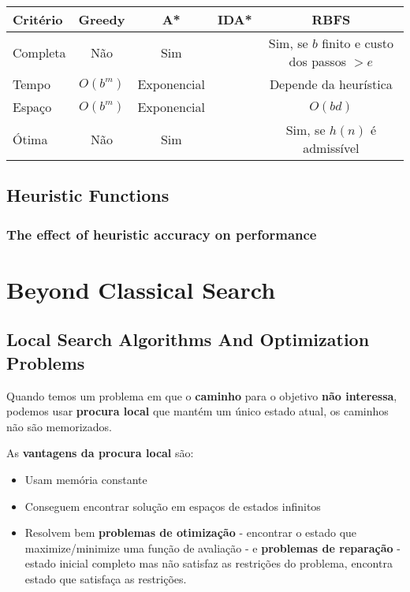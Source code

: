 \documentclass[11pt]{article}
\begin{document}
\begin{tabular}[t]{ | l | c | c | c | c | }\hline
    Critério & Greedy   & A*          & IDA* & RBFS \\\hline
    Completa & Não      & Sim         &      & Sim, se $b$ finito e custo dos passos $>e$ \\\hline
    Tempo    & $O(b^m)$ & Exponencial &      & Depende da heurística \\\hline
    Espaço   & $O(b^m)$ & Exponencial &      & $O(bd)$ \\\hline
    Ótima    & Não      & Sim         &      & Sim, se $h(n)$ é admissível     \\\hline
\end{tabular}

\subsection{Heuristic Functions}


\subsubsection{The effect of heuristic accuracy on performance}


\newpage
\section{Beyond Classical Search}

\subsection{Local Search Algorithms And Optimization Problems}

Quando temos um problema em que o \textbf{caminho} para o objetivo \textbf{não interessa}, podemos usar \textbf{procura local} que mantém um único estado atual, os caminhos não são memorizados.\vspace{4pt}

As \textbf{vantagens da procura local} são:
\begin{itemize}[topsep=2pt,itemsep=0pt]
    \item Usam memória constante
    \item Conseguem encontrar solução em espaços de estados infinitos
    \item Resolvem bem \textbf{problemas de otimização} - encontrar o estado que maximize/minimize uma função de avaliação - e \textbf{problemas de reparação} - estado inicial completo mas não satisfaz as restrições do problema, encontra estado que satisfaça as restrições.
\end{itemize}
\vspace{4pt}
\end{document}
